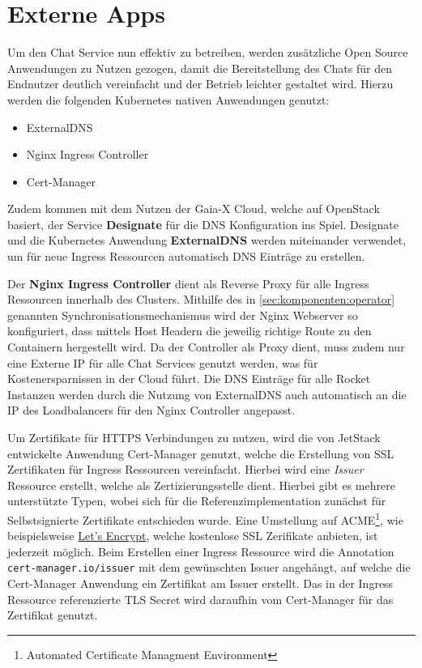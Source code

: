 \section{Externe Apps}
\label{sec:komponenten:externe-apps}

Um den Chat Service nun effektiv zu betreiben, werden zusätzliche Open Source Anwendungen zu Nutzen gezogen,
damit die Bereitstellung des Chats für den Endnutzer deutlich vereinfacht und der Betrieb leichter gestaltet wird.
Hierzu werden die folgenden Kubernetes nativen Anwendungen genutzt:
\begin{itemize}
  \item ExternalDNS
  \item Nginx Ingress Controller
  \item Cert-Manager
\end{itemize}

Zudem kommen mit dem Nutzen der Gaia-X Cloud, welche auf OpenStack basiert, der Service \textbf{Designate}
für die DNS Konfiguration ins Spiel. Designate und die Kubernetes Anwendung \textbf{ExternalDNS} werden miteinander
verwendet, um für neue Ingress Ressourcen automatisch DNS Einträge zu erstellen. 

Der \textbf{Nginx Ingress Controller} dient als Reverse Proxy für alle Ingress Ressourcen innerhalb des Clusters.
Mithilfe des in \ref{sec:komponenten:operator} genannten Synchronisationsmechanismus wird der Nginx Webserver so 
konfiguriert, dass mittels Host Headern die jeweilig richtige Route zu den Containern hergestellt wird. 
Da der Controller als Proxy dient, muss zudem nur eine Externe IP für alle Chat Services genutzt werden, was
für Kostenersparnissen in der Cloud führt. Die DNS Einträge für alle Rocket Instanzen werden durch die Nutzung 
von ExternalDNS auch automatisch an die IP des Loadbalancers für den Nginx Controller angepasst.

Um Zertifikate für HTTPS Verbindungen zu nutzen, wird die von JetStack entwickelte Anwendung Cert-Manager genutzt,
welche die Erstellung von SSL Zertifikaten für Ingress Ressourcen vereinfacht. Hierbei wird eine \emph{Issuer} Ressource
erstellt, welche als Zertizierungsstelle dient.\cite{CertManager2021} Hierbei gibt es mehrere unterstützte Typen, wobei sich
für die Referenzimplementation zunächst für Selbstsignierte Zertifikate entschieden wurde. 
Eine Umstellung auf ACME\footnote{Automated Certificate Managment Environment},
wie beispielsweise \href{https://letsencrypt.org/de/}{Let's Encrypt}, welche kostenlose SSL Zerifikate anbieten,
ist jederzeit möglich. 
Beim Erstellen einer Ingress Ressource wird die Annotation \texttt{cert-manager.io/issuer} mit dem gewünschten Issuer angehängt,
auf welche die Cert-Manager Anwendung ein Zertifikat am Issuer erstellt. 
Das in der Ingress Ressource referenzierte TLS Secret wird daraufhin vom Cert-Manager für das Zertifikat genutzt.

